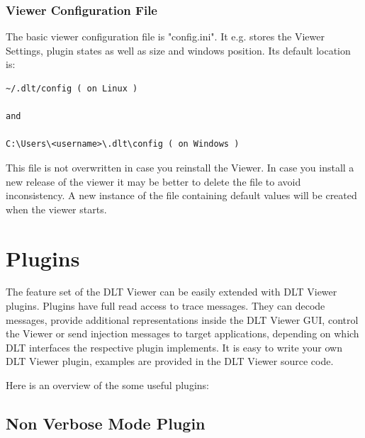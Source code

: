 \documentclass[a4paper,11pt]{article}
\begin{document}

\subsubsection{Viewer Configuration File}

The basic viewer configuration file is "config.ini". It e.g. stores the Viewer Settings, plugin states as well as size and windows position.
Its default location is:

\begin{verbatim}
~/.dlt/config ( on Linux )

and

C:\Users\<username>\.dlt\config ( on Windows )
\end{verbatim}



This file is not overwritten in case you reinstall the Viewer.
In case you install a new release of the viewer it may be better
to delete the file to avoid inconsistency.
A new instance of the file containing default values will be created when the viewer starts.


\pagebreak

\section{Plugins}
\label{plugins}

The feature set of the DLT Viewer can be easily extended with DLT Viewer plugins.
Plugins have full read access to trace messages. They can decode messages,
provide additional representations inside the DLT Viewer GUI, control the Viewer or send injection messages
to target applications, depending on which DLT interfaces the respective plugin implements.
It is easy to write your own DLT Viewer plugin, examples are provided in the DLT Viewer source code.

Here is an overview of the some useful plugins:

\subsection{Non Verbose Mode Plugin}
\end{document}
